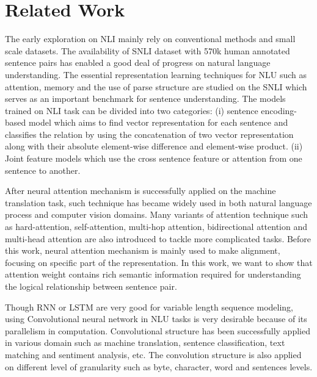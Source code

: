\documentclass{article} \usepackage{iclr2018_conference,times}
\begin{document}
\section{Related Work}
The early exploration on NLI mainly rely on conventional methods and small scale datasets\citep{SICK_Marelli:2014us}. The availability of SNLI dataset with 570k human annotated sentence pairs has enabled a good deal of progress on natural language understanding. The essential representation learning techniques for NLU such as attention\citep{mLSTM_Wang:2015vx}, memory\citep{NSEMunkhdalai:2016th} and the use of parse structure\citep{spinnBowman:2016um,treeCNN_Mou:2015tp} are studied on the SNLI which serves as an important benchmark for sentence understanding. The models trained on NLI task can be divided into two categories: (i) sentence encoding-based model which aims to find vector representation for each sentence and classifies the relation by using the concatenation of two vector representation along with their absolute element-wise difference and element-wise product\citep{spinnBowman:2016um,pretrainGRU_Vendrov:2015ua,treeCNN_Mou:2015tp,bilstm_intraatt_Liu:2016tz,NSEMunkhdalai:2016th}. (ii) Joint feature models which use the cross sentence feature or attention from one sentence to another\citep{LSTM_att_Rocktaschel:2015wu,mLSTM_Wang:2015vx,LSTMN_Cheng:2016wu,decomposable_Parikh:2016tz,BIMPM_Wang:2017td,NTI_Yu:2017wd,re_read_Sha:2016ws}.

After neural attention mechanism is successfully applied on the machine translation task, such technique has became widely used in both natural language process and computer vision domains. Many variants of attention technique such as hard-attention\citep{hard_att_Xu:2015ut}, self-attention\citep{decomposable_Parikh:2016tz}, multi-hop attention\citep{RR_Gong:2017wo}, bidirectional attention\citep{BIDAF_Seo:2016tp} and multi-head attention\citep{AttentionIsALLYouNeedVaswani:2017ul} are also introduced to tackle more complicated tasks. Before this work, neural attention mechanism is mainly used to make alignment, focusing on specific part of the representation. In this work, we want to show that attention weight contains rich semantic information required for understanding the logical relationship between sentence pair.


Though RNN or LSTM are very good for variable length sequence modeling, using Convolutional neural network in NLU tasks is very desirable because of its parallelism in computation. Convolutional structure has been successfully applied in various domain such as machine translation\citep{ConvS2S_Gehring:2017tv}, sentence classification\citep{conv_sentence_classification_2014arXiv1408.5882K}, text matching\citep{conv_matching_Hu:2014uo} and sentiment analysis\citep{conv_sentence_Kalchbrenner:2014wl}, etc. The convolution structure is also applied on different level of granularity such as byte\citep{byteConv_Zhang:2017vi}, character\citep{charConv_2015arXiv150901626Z}, word\citep{ConvS2S_Gehring:2017tv} and sentences\citep{treeCNN_Mou:2015tp} levels. 
\end{document}
